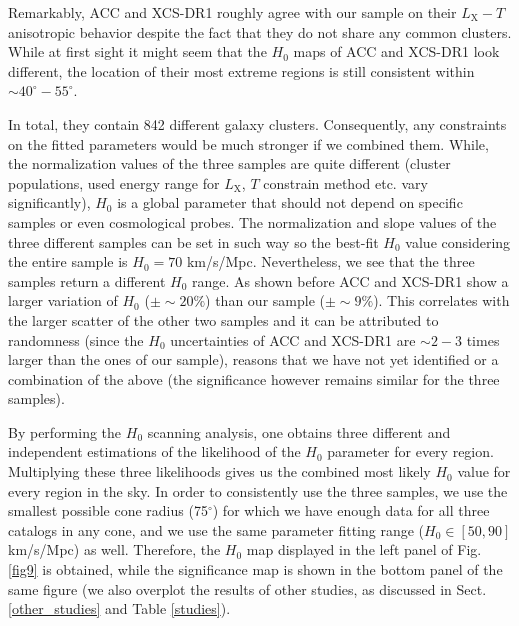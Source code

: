 \documentclass{aa}   %
\begin{document}
Remarkably, ACC and XCS-DR1 roughly agree with our sample on their $L_{\text{X}}-T$ anisotropic behavior despite the fact that they do not share any common clusters. While at first sight it might seem that the $H_0$ maps of ACC and XCS-DR1 look different, the location of their most extreme regions is still consistent within $\sim 40^{\circ}-55^{\circ}$. 

In total, they contain 842 different galaxy clusters. Consequently, any constraints on the fitted parameters would be much stronger if we combined them. While, the normalization values of the three samples are quite different (cluster populations, used energy range for $L_{\text{X}}$, $T$ constrain method etc. vary significantly), $H_0$ is a global parameter that should not depend on specific samples or even cosmological probes. The normalization and slope values of the three different samples can be set in such way so the best-fit $H_0$ value considering the entire sample is $H_0=70$ km/s/Mpc. Nevertheless, we see that the three samples return a different $H_0$ range. As shown before ACC and XCS-DR1 show a larger variation of $H_0$ ($\pm \sim 20\%$) than our sample ($\pm \sim 9\%$). This correlates with the larger scatter of the other two samples and it can be attributed to randomness (since the $H_0$ uncertainties of ACC and XCS-DR1 are $\sim 2-3$ times larger than the ones of our sample), reasons that we have not yet identified or a combination of the above (the significance however remains similar for the three samples).

By performing the $H_0$ scanning analysis, one obtains three different and independent estimations of the likelihood of the $H_0$ parameter for every region. Multiplying these three likelihoods gives us the combined most likely $H_0$ value for every region in the sky. In order to consistently use the three samples, we use the smallest possible cone radius (75$^{\circ}$) for which we have enough data for all three catalogs in any cone, and we use the same parameter fitting range ($H_0\in [50,90]$ km/s/Mpc) as well. Therefore, the $H_0$ map displayed in the left panel of Fig. \ref{fig9} is obtained, while the significance map is shown in the bottom panel of the same figure (we also overplot the results of other studies, as discussed in Sect. \ref{other_studies} and Table \ref{studies}).
\end{document}
